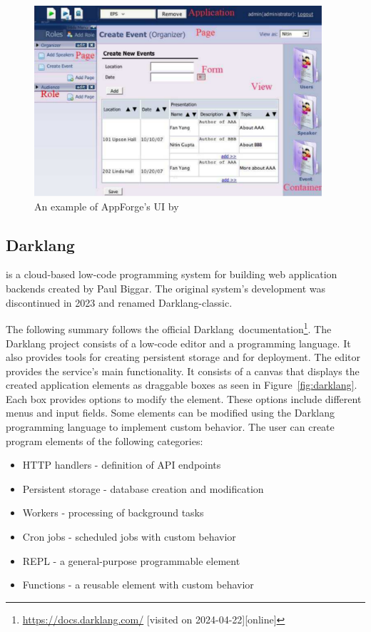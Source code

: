 \begin{figure}[htbp]
	\begin{center}
		\includegraphics[width=0.95\textwidth]{img/appforge.pdf}
	\end{center}
	\caption{An example of AppForge's UI by \citet{Yang_Gupta_Botev_Churchill_Levchenko_Shanmugasundaram_2008} }
	\label{fig:appforge}
\end{figure}


\subsection{Darklang}
\label{sec:darklang}
\citet{darklang} is a cloud-based low-code programming system for building web application backends created by Paul Biggar.
The original system's development was discontinued in 2023 and renamed Darklang-classic.

The following summary follows the official Darklang~documentation\footnote{\url{https://docs.darklang.com/} [visited on 2024-04-22][online]}.
The Darklang project consists of a low-code editor and a programming language. It also provides tools for creating persistent storage and for deployment.
The editor provides the service's main functionality. It consists of a canvas that displays the created application elements as draggable boxes as seen in Figure~\ref{fig:darklang}.
Each box provides options to modify the element. These options include different menus and input fields.
Some elements can be modified using the Darklang programming language to implement custom behavior.
The user can create program elements of the following categories:
\begin{itemize}
	\item HTTP handlers - definition of API endpoints
	\item Persistent storage - database creation and modification
	\item Workers - processing of background tasks
	\item Cron jobs - scheduled jobs with custom behavior
	\item REPL - a general-purpose programmable element
	\item Functions - a reusable element with custom behavior
\end{itemize}

